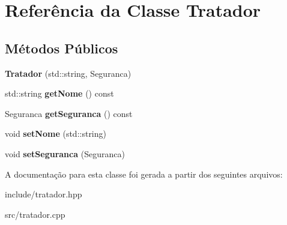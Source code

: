 \hypertarget{classTratador}{}\section{Referência da Classe Tratador}
\label{classTratador}
\subsection*{Métodos Públicos}
\begin{DoxyCompactItemize}
\item 
\mbox{\label{classTratador_abcecf1cf66f5e9aaa866d9d19a5e9839}} 
{\bfseries Tratador} (std\+::string, Seguranca)
\item 
\mbox{\label{classTratador_a3186b9539cbbb92a35e104e186e7d32d}} 
std\+::string {\bfseries get\+Nome} () const
\item 
\mbox{\label{classTratador_a5343cfed4610b98300de68fbb52e44d3}} 
Seguranca {\bfseries get\+Seguranca} () const
\item 
\mbox{\label{classTratador_ace1cef7634c8ed1a43d819d35ee19ebf}} 
void {\bfseries set\+Nome} (std\+::string)
\item 
\mbox{\label{classTratador_adbf61d3bbeed7bbcd7baa948a6e6d379}} 
void {\bfseries set\+Seguranca} (Seguranca)
\end{DoxyCompactItemize}


A documentação para esta classe foi gerada a partir dos seguintes arquivos\+:\begin{DoxyCompactItemize}
\item 
include/tratador.\+hpp\item 
src/tratador.\+cpp\end{DoxyCompactItemize}
